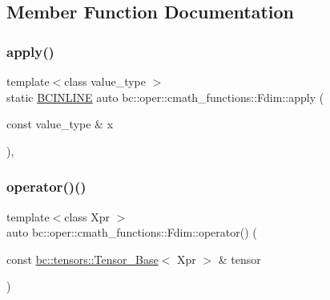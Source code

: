 \subsection{Member Function Documentation}
\mbox{\label{structbc_1_1oper_1_1cmath__functions_1_1Fdim_ac4cbe6082c1f6d0be40a40b1259a1092}} 
\subsubsection{\texorpdfstring{apply()}{apply()}}
{\footnotesize\ttfamily template$<$class value\+\_\+type $>$ \\
static \hyperlink{common_8h_a6699e8b0449da5c0fafb878e59c1d4b1}{B\+C\+I\+N\+L\+I\+NE} auto bc\+::oper\+::cmath\+\_\+functions\+::\+Fdim\+::apply (\begin{DoxyParamCaption}\item[{const value\+\_\+type \&}]{x }\end{DoxyParamCaption})\hspace{0.3cm}{\ttfamily [inline]}, {\ttfamily [static]}}

\mbox{\label{structbc_1_1oper_1_1cmath__functions_1_1Fdim_a2e847f55d7f0dccf008fb967e71de633}} 
\subsubsection{\texorpdfstring{operator()()}{operator()()}\hspace{0.1cm}{\footnotesize\ttfamily [1/3]}}
{\footnotesize\ttfamily template$<$class Xpr $>$ \\
auto bc\+::oper\+::cmath\+\_\+functions\+::\+Fdim\+::operator() (\begin{DoxyParamCaption}\item[{const \hyperlink{classbc_1_1tensors_1_1Tensor__Base}{bc\+::tensors\+::\+Tensor\+\_\+\+Base}$<$ Xpr $>$ \&}]{tensor }\end{DoxyParamCaption})\hspace{0.3cm}{\ttfamily [inline]}}


